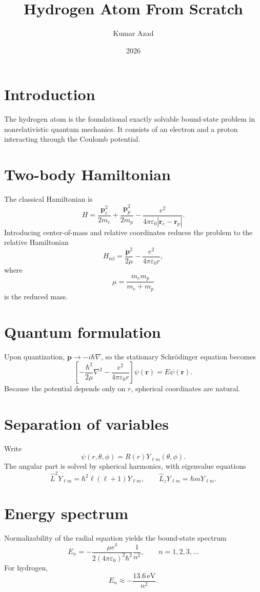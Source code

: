 \documentclass[11pt]{article}
\title{Hydrogen Atom From Scratch}
\author{Kumar Azad}
\date{2026}
\begin{document}
\maketitle

\section{Introduction}
The hydrogen atom is the foundational exactly solvable bound-state problem in nonrelativistic quantum mechanics. It consists of an electron and a proton interacting through the Coulomb potential.

\section{Two-body Hamiltonian}
The classical Hamiltonian is
\[
H = \frac{\mathbf p_e^2}{2m_e} + \frac{\mathbf p_p^2}{2m_p} - \frac{e^2}{4\pi\varepsilon_0 |\mathbf r_e - \mathbf r_p|}.
\]
Introducing center-of-mass and relative coordinates reduces the problem to the relative Hamiltonian
\[
H_{\mathrm{rel}} = \frac{\mathbf p^2}{2\mu} - \frac{e^2}{4\pi\varepsilon_0 r},
\]
where
\[
\mu = \frac{m_e m_p}{m_e + m_p}
\]
is the reduced mass.

\section{Quantum formulation}
Upon quantization, $\mathbf p \to -i\hbar \nabla$, so the stationary Schr\"odinger equation becomes
\[
\left[-\frac{\hbar^2}{2\mu}\nabla^2 - \frac{e^2}{4\pi\varepsilon_0 r}\right]\psi(\mathbf r) = E\psi(\mathbf r).
\]
Because the potential depends only on $r$, spherical coordinates are natural.

\section{Separation of variables}
Write
\[
\psi(r,\theta,\phi)=R(r)Y_{\ell m}(\theta,\phi).
\]
The angular part is solved by spherical harmonics, with eigenvalue equations
\[
\hat L^2 Y_{\ell m}=\hbar^2 \ell(\ell+1)Y_{\ell m},
\qquad
\hat L_z Y_{\ell m}=\hbar m Y_{\ell m}.
\]

\section{Energy spectrum}
Normalizability of the radial equation yields the bound-state spectrum
\[
E_n = -\frac{\mu e^4}{2(4\pi\varepsilon_0)^2\hbar^2}\frac{1}{n^2},
\qquad n=1,2,3,\dots
\]
For hydrogen,
\[
E_n \approx -\frac{13.6\,\mathrm{eV}}{n^2}.
\]
\end{document}
